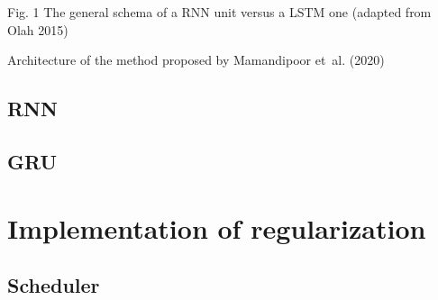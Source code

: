 Fig. 1 The general schema of a RNN unit versus a LSTM one (adapted from Olah 2015)

Architecture of the method proposed by Mamandipoor et al. (2020)

\subsection{RNN}

\subsection{GRU}

\section{Implementation of regularization}

\subsection{Scheduler}

